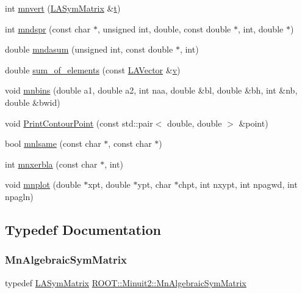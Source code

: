 \begin{DoxyCompactItemize}
int \mbox{\hyperlink{namespaceROOT_1_1Minuit2_a5e64c8eae56aaee62f3b683068e1148a}{mnvert}} (\mbox{\hyperlink{classROOT_1_1Minuit2_1_1LASymMatrix}{L\+A\+Sym\+Matrix}} \&\mbox{\hyperlink{hadron__timeslice_8cc_ac310d9181e916ba43604099aee272c71}{t}})
\item 
int \mbox{\hyperlink{namespaceROOT_1_1Minuit2_acc89c3c759da8dc191d0a862e354a555}{mndspr}} (const char $\ast$, unsigned int, double, const double $\ast$, int, double $\ast$)
\item 
double \mbox{\hyperlink{namespaceROOT_1_1Minuit2_a6945787dc86a55296d0de1bf1fefc508}{mndasum}} (unsigned int, const double $\ast$, int)
\item 
double \mbox{\hyperlink{namespaceROOT_1_1Minuit2_a30e3cb02f21de446d5a4611ef1e8becd}{sum\+\_\+of\+\_\+elements}} (const \mbox{\hyperlink{classROOT_1_1Minuit2_1_1LAVector}{L\+A\+Vector}} \&\mbox{\hyperlink{hadron__timeslice_8cc_a716fc87f5e814be3ceee2405ed6ff22a}{v}})
\item 
void \mbox{\hyperlink{namespaceROOT_1_1Minuit2_ac22433ee68c6274fa7028a58763d04bd}{mnbins}} (double a1, double a2, int naa, double \&bl, double \&bh, int \&nb, double \&bwid)
\item 
void \mbox{\hyperlink{namespaceROOT_1_1Minuit2_a4075583a4cbc4a719ed2ec32e1d76bbf}{Print\+Contour\+Point}} (const std\+::pair$<$ double, double $>$ \&point)
\item 
bool \mbox{\hyperlink{namespaceROOT_1_1Minuit2_a3f90b826c2c1b4313f9a90c22b8ee657}{mnlsame}} (const char $\ast$, const char $\ast$)
\item 
int \mbox{\hyperlink{namespaceROOT_1_1Minuit2_a6c2d97c42f0b3f75b7370ae5e6f2c638}{mnxerbla}} (const char $\ast$, int)
\item 
void \mbox{\hyperlink{namespaceROOT_1_1Minuit2_a2c786d8330736525f0757ba1848f5bc4}{mnplot}} (double $\ast$xpt, double $\ast$ypt, char $\ast$chpt, int nxypt, int npagwd, int npagln)
\end{DoxyCompactItemize}


\subsection{Typedef Documentation}
\mbox{\label{namespaceROOT_1_1Minuit2_a9e74ad97f5537a2e80e52b04d98ecc6e}} 
\subsubsection{\texorpdfstring{MnAlgebraicSymMatrix}{MnAlgebraicSymMatrix}}
{\footnotesize\ttfamily typedef \mbox{\hyperlink{classROOT_1_1Minuit2_1_1LASymMatrix}{L\+A\+Sym\+Matrix}} \mbox{\hyperlink{namespaceROOT_1_1Minuit2_a9e74ad97f5537a2e80e52b04d98ecc6e}{R\+O\+O\+T\+::\+Minuit2\+::\+Mn\+Algebraic\+Sym\+Matrix}}}

